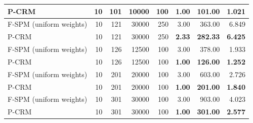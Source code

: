 \begin{tabular}{lrrrrrrr}
P-CRM & 10 & 101 & 10000 & 100 & \textbf{1.00} & \textbf{101.00} & \textbf{1.021} \\
\midrule
F-SPM (uniform weights) & 10 & 121 & 30000 & 250 & 3.00 & 363.00 & 6.849 \\
P-CRM & 10 & 121 & 30000 & 250 & \textbf{2.33} & \textbf{282.33} & \textbf{6.425} \\
\midrule
F-SPM (uniform weights) & 10 & 126 & 12500 & 100 & 3.00 & 378.00 & 1.933 \\
P-CRM & 10 & 126 & 12500 & 100 & \textbf{1.00} & \textbf{126.00} & \textbf{1.252} \\
\midrule
F-SPM (uniform weights) & 10 & 201 & 20000 & 100 & 3.00 & 603.00 & 2.726 \\
P-CRM & 10 & 201 & 20000 & 100 & \textbf{1.00} & \textbf{201.00} & \textbf{1.840} \\
\midrule
F-SPM (uniform weights) & 10 & 301 & 30000 & 100 & 3.00 & 903.00 & 4.023 \\
P-CRM & 10 & 301 & 30000 & 100 & \textbf{1.00} & \textbf{301.00} & \textbf{2.577} \\
\bottomrule
\end{tabular}
